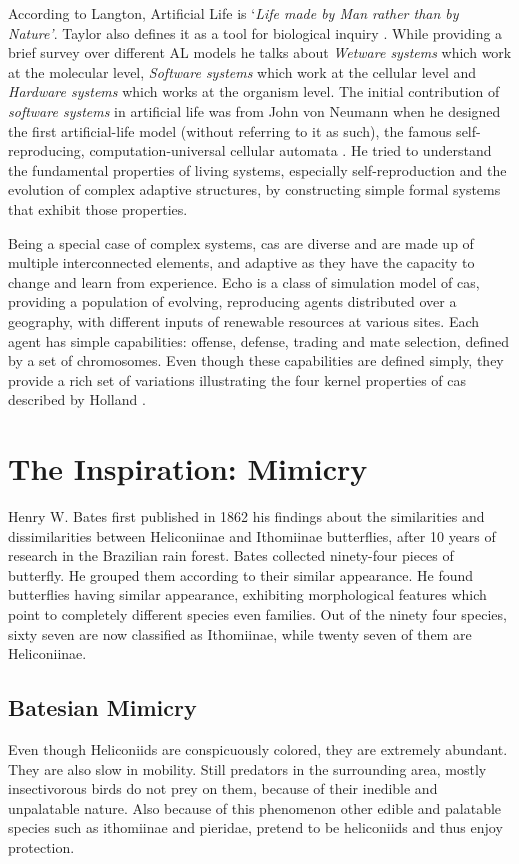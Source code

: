 \documentclass[letterpaper]{article}
\numberwithin{equation}{section}
\begin{document}
According to Langton, Artificial Life is `\textsl{Life made by Man rather than by Nature'}. Taylor also defines it as a tool for biological inquiry \citep{taylor1993}. While providing a brief survey over different AL models he talks about \textsl{Wetware systems} which work at the molecular level, \textsl{Software systems} which work at the cellular level and \textsl{Hardware systems} which works at the organism level. The initial contribution of \textsl{software systems} in artificial life was from John von Neumann when he designed the first artificial-life model (without referring to it as such), the famous self-reproducing, computation-universal cellular automata \citep{neumann1966}. He tried to understand the fundamental properties of living systems, especially self-reproduction and the evolution of complex adaptive structures, by constructing simple formal systems that exhibit those properties.

Being a special case of complex systems, \gls{cas} are diverse and are made up of multiple interconnected elements, and adaptive as they have the capacity to change and learn from experience. Echo \citep{hraber1997} is a class of simulation model of \gls{cas}, providing a population of evolving, reproducing agents distributed over a geography, with different inputs of renewable resources at various sites. Each agent has simple capabilities: offense, defense, trading and mate selection, defined by a set of chromosomes. Even though these capabilities are defined simply, they provide a rich set of variations illustrating the four kernel properties of \gls{cas} described by Holland \citep{holland1996}.

\section{The Inspiration: Mimicry}
\label{section:mimicry}

Henry W. Bates first published in 1862 his findings about the similarities and dissimilarities between Heliconiinae and Ithomiinae butterflies, after 10 years of research in the Brazilian rain forest. Bates collected ninety-four pieces of butterfly. He grouped them according to their similar appearance. He found butterflies having similar appearance, exhibiting morphological features which point to completely different species even families. Out of the ninety four species, sixty seven are now classified as Ithomiinae, while twenty seven of them are Heliconiinae.

\subsection{Batesian Mimicry}
Even though Heliconiids are conspicuously colored, they are extremely abundant. They are also slow in mobility. Still predators in the surrounding area, mostly insectivorous birds do not prey on them, because of their inedible and unpalatable nature. Also because of this phenomenon other edible and palatable species such as ithomiinae and pieridae, pretend to be heliconiids and thus enjoy protection.
\end{document}
